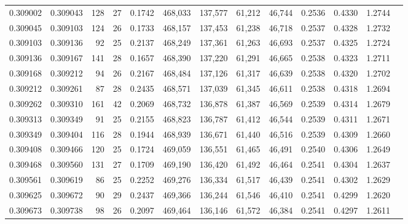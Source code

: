 \begin{tabular}{rrrrrrrrrrrrr}
0.309002 & 0.309043 &   128 &  27 &                                     0.1742 & 468,033 & 137,577 &  61,212 &  46,744 & 0.2536 & 0.4330 & 1.2744 \\
0.309045 & 0.309103 &   124 &  26 &                                     0.1733 & 468,157 & 137,453 &  61,238 &  46,718 & 0.2537 & 0.4328 & 1.2732 \\
0.309103 & 0.309136 &    92 &  25 &                                     0.2137 & 468,249 & 137,361 &  61,263 &  46,693 & 0.2537 & 0.4325 & 1.2724 \\
0.309136 & 0.309167 &   141 &  28 &                                     0.1657 & 468,390 & 137,220 &  61,291 &  46,665 & 0.2538 & 0.4323 & 1.2711 \\
0.309168 & 0.309212 &    94 &  26 &                                     0.2167 & 468,484 & 137,126 &  61,317 &  46,639 & 0.2538 & 0.4320 & 1.2702 \\
0.309212 & 0.309261 &    87 &  28 &                                     0.2435 & 468,571 & 137,039 &  61,345 &  46,611 & 0.2538 & 0.4318 & 1.2694 \\
0.309262 & 0.309310 &   161 &  42 &                                     0.2069 & 468,732 & 136,878 &  61,387 &  46,569 & 0.2539 & 0.4314 & 1.2679 \\
0.309313 & 0.309349 &    91 &  25 &                                     0.2155 & 468,823 & 136,787 &  61,412 &  46,544 & 0.2539 & 0.4311 & 1.2671 \\
0.309349 & 0.309404 &   116 &  28 &                                     0.1944 & 468,939 & 136,671 &  61,440 &  46,516 & 0.2539 & 0.4309 & 1.2660 \\
0.309408 & 0.309466 &   120 &  25 &                                     0.1724 & 469,059 & 136,551 &  61,465 &  46,491 & 0.2540 & 0.4306 & 1.2649 \\
0.309468 & 0.309560 &   131 &  27 &                                     0.1709 & 469,190 & 136,420 &  61,492 &  46,464 & 0.2541 & 0.4304 & 1.2637 \\
0.309561 & 0.309619 &    86 &  25 &                                     0.2252 & 469,276 & 136,334 &  61,517 &  46,439 & 0.2541 & 0.4302 & 1.2629 \\
0.309625 & 0.309672 &    90 &  29 &                                     0.2437 & 469,366 & 136,244 &  61,546 &  46,410 & 0.2541 & 0.4299 & 1.2620 \\
0.309673 & 0.309738 &    98 &  26 &                                     0.2097 & 469,464 & 136,146 &  61,572 &  46,384 & 0.2541 & 0.4297 & 1.2611 \\

\end{tabular}
